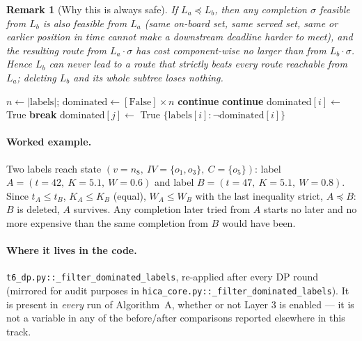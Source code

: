 \documentclass[11pt]{article}
\newtheorem{remark}{Remark}
\begin{document}
\begin{remark}[Why this is always safe]
If $L_a\preceq L_b$, then any completion $\sigma$ feasible from $L_b$ is also feasible from
$L_a$ (same on-board set, same served set, same or earlier position in time cannot make a
downstream deadline harder to meet), and the resulting route from $L_a\cdot\sigma$ has cost
component-wise no larger than from $L_b\cdot\sigma$. Hence $L_b$ can never lead to a route that
strictly beats every route reachable from $L_a$; deleting $L_b$ and its whole subtree loses
nothing.
\end{remark}

\begin{algorithm}[H]
\caption{Layer 1 --- filter dominated labels at one DP round}
\label{alg:layer1}
\begin{algorithmic}[1]
  \State $n \gets |\text{labels}|$; $\text{dominated} \gets [\text{False}]\times n$
     \textbf{continue} \EndIf
       \textbf{continue} \EndIf
       \State dominated$[i]\gets$ True \State \textbf{break} \EndIf
       \State dominated$[j]\gets$ True \EndIf
    \EndFor
  \EndFor
  \State \Return $\{\text{labels}[i] : \neg\text{dominated}[i]\}$
\EndFunction
\end{algorithmic}
\end{algorithm}

\paragraph{Worked example.} Two labels reach state $(v{=}n_8,\ IV{=}\{o_1,o_3\},\
C{=}\{o_5\})$: label $A=(t{=}42,\ K{=}5.1,\ W{=}0.6)$ and label $B=(t{=}47,\ K{=}5.1,\
W{=}0.8)$. Since $t_A\le t_B$, $K_A\le K_B$ (equal), $W_A\le W_B$ with the last inequality
strict, $A\preceq B$: $B$ is deleted, $A$ survives. Any completion later tried from $A$ starts
no later and no more expensive than the same completion from $B$ would have been.

\paragraph{Where it lives in the code.} \texttt{t6\_dp.py::\_filter\_dominated\_labels},
re-applied after every DP round (mirrored for audit purposes in
\texttt{hica\_core.py::\_filter\_dominated\_labels}). It is present in \emph{every} run of
Algorithm~A, whether or not Layer 3 is enabled --- it is not a variable in any of the
before/after comparisons reported elsewhere in this track.
\end{document}

